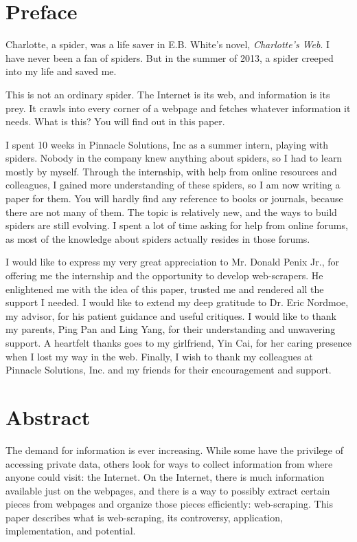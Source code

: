 \documentclass[12pt,twoside,draft]{report}
\begin{document}
\cleardoublepage
\chapter*{Preface}

Charlotte, a spider, was a life saver in E.B. White's novel, \textit{Charlotte's Web}. I have never been a fan of spiders. But in the summer of 2013, a spider creeped into my life and saved me.

This is not an ordinary spider. The Internet is its web, and information is its prey. It crawls into every corner of a webpage and fetches whatever information it needs. What is this? You will find out in this paper.

I spent 10 weeks in Pinnacle Solutions, Inc as a summer intern, playing with spiders. Nobody in the company knew anything about spiders, so I had to learn mostly by myself. Through the internship, with help from online resources and colleagues, I gained more understanding of these spiders, so I am now writing a paper for them. You will hardly find any reference to books or journals, because there are not many of them. The topic is relatively new, and the ways to build spiders are still evolving. I spent a lot of time asking for help from online forums, as most of the knowledge about spiders actually resides in those forums.

I would like to express my very great appreciation to Mr. Donald Penix Jr., for offering me the internship and the opportunity to develop web-scrapers. He enlightened me with the idea of this paper, trusted me and rendered all the support I needed. I would like to extend my deep gratitude to Dr. Eric Nordmoe, my advisor, for his patient guidance and useful critiques. I would like to thank my parents, Ping Pan and Ling Yang, for their understanding and unwavering support. A heartfelt thanks goes to my girlfriend, Yin Cai, for her caring presence when I lost my way in the web. Finally, I wish to thank my colleagues at Pinnacle Solutions, Inc. and my friends for their encouragement and support.
\cleardoublepage
\chapter*{Abstract}

The demand for information is ever increasing. While some have the privilege of accessing private data, others look for ways to collect information from where anyone could visit: the Internet. On the Internet, there is much information available just on the webpages, and there is a way to possibly extract certain pieces from webpages and organize those pieces efficiently: web-scraping. This paper describes what is web-scraping, its controversy, application, implementation, and potential. 
\end{document}

